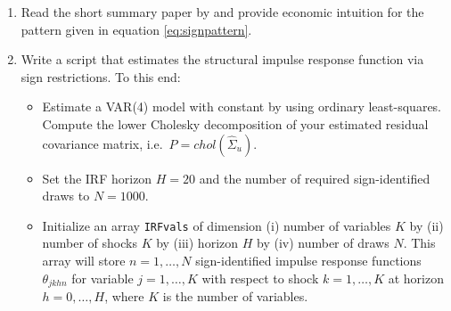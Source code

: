 \documentclass{article}
\begin{document}
\begin{enumerate}
\item Read the short summary paper by \textcite{Wolf_2022_WhatCanWe} and provide economic intuition for the pattern given in equation \eqref{eq:signpattern}.
\item Write a script that estimates the structural impulse response function via sign restrictions.
To this end:
	\begin{itemize}
	\item Estimate a VAR(4) model with constant by using ordinary least-squares.
	Compute the lower Cholesky decomposition of your estimated residual covariance matrix, i.e.\ \( P = chol(\hat{\Sigma}_u) \).
	\item Set the IRF horizon \(H=20\) and the number of required sign-identified draws to \(N=1000\).
	\item Initialize an array \texttt{IRFvals} of dimension
	(i) number of variables \(K\) by (ii) number of shocks \(K\) by (iii) horizon \(H\) by (iv) number of draws \(N\).
	This array will store \(n=1,\ldots,N\) sign-identified impulse response functions \(\theta_{jkhn}\) for variable \(j=1,\ldots,K\)
	with respect to shock \(k=1,\ldots,K\) at horizon \(h=0,\ldots,H\), where \(K\) is the number of variables.
	

\end{itemize}
\end{enumerate}
\end{document}
